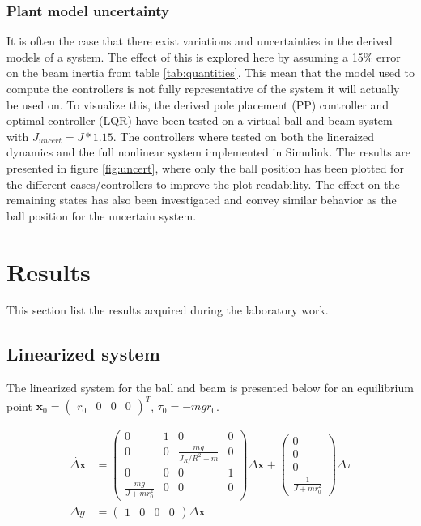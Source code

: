 \documentclass[a4paper, titlepage]{article}
\begin{document}
\subsubsection{Plant model uncertainty}
It is often the case that there exist variations and uncertainties in the derived models of a system.
The effect of this is explored here by assuming a 15\% error on the beam inertia from table \ref{tab:quantities}.
This mean that the model used to compute the controllers is not fully representative of the system it will actually be used on.
To visualize this, the derived pole placement (PP) controller and optimal controller (LQR) have been tested on a virtual ball and beam system with $J_{uncert} = J*1.15$.
The controllers where tested on both the lineraized dynamics and the full nonlinear system implemented in Simulink.
The results are presented in figure \ref{fig:uncert}, where only the ball position has been plotted for the different cases/controllers to improve the plot readability.
The effect on the remaining states has also been investigated and convey similar behavior as the ball position for the uncertain system.


\section{Results}
This section list the results acquired during the laboratory work.

\subsection{Linearized system}
The linearized system for the ball and beam is presented below for an equilibrium point $\textbf{x}_0 = \begin{pmatrix} r_0 & 0 & 0 & 0 \end{pmatrix}^T$, $\tau_0 = -mgr_0$.

\begin{equation}
\begin{split}
\dot{\Delta\textbf{x}} &= 
\begin{pmatrix}
0 & 1 & 0 & 0 \\
0 & 0 & \frac{mg}{J_R/R^2 + m} & 0 \\
0 & 0 & 0 & 1 \\
\frac{mg}{J + mr_0^2} & 0 & 0 & 0
\end{pmatrix}\Delta\textbf{x} + \begin{pmatrix}
0 \\ 0 \\ 0 \\ \frac{1}{J + mr_0^2}
\end{pmatrix}\Delta\tau \\
\Delta y &= \begin{pmatrix}
1 & 0 & 0 & 0
\end{pmatrix}\Delta\textbf{x}
\end{split}
\label{equ:linSys}
\end{equation}
\end{document}
